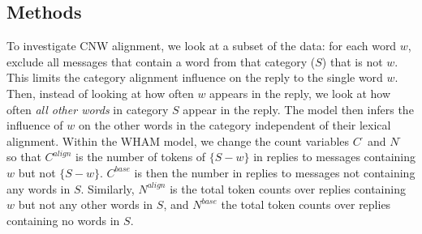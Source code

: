 \documentclass[11pt]{article}
\begin{document}




\subsection{Methods}

To investigate CNW alignment, we look at a subset of the data: for each word $w$, exclude all messages that contain a word from that category ($S$) that is not $w$. This limits the category alignment influence on the reply to the single word $w$. Then, instead of looking at how often $w$ appears in the reply, we look at how often \emph{all other words} in category $S$ appear in the reply.  The model then infers the influence of $w$ on the other words in the category independent of their lexical alignment. Within the WHAM model, we change the count variables $C^\cdot$ and $N^\cdot$ so that $C^{align}$ is the number of tokens of $\{S-w\}$ in replies to messages containing $w$ but not $\{S - w\}$. $C^{base}$ is then the number in replies to messages not containing any words in $S$.  Similarly, $N^{align}$ is the total token counts over replies containing $w$ but not any other words in $S$, and $N^{base}$ the total token counts over replies containing no words in $S$.
\end{document}

